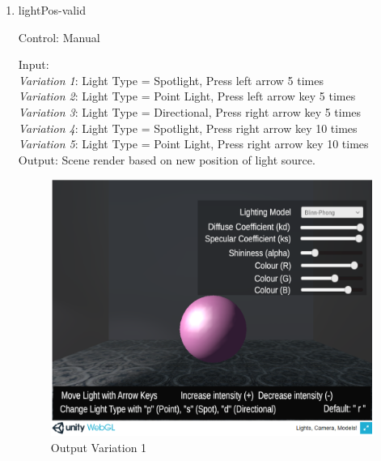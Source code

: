 \documentclass[12pt, titlepage]{article}
\begin{document}
\begin{enumerate}
	\item{lightPos-valid\\}
	
	Control: Manual
	
	Input: \\
	\textit{Variation 1}: Light Type = Spotlight, Press left arrow 5 times\\
	\textit{Variation 2}: Light Type = Point Light, Press left arrow key 5 
	times\\
	\textit{Variation 3}: Light Type = Directional, Press right arrow key 5 
	times\\
	\textit{Variation 4}: Light Type = Spotlight, Press right arrow key 10
	times\\
	\textit{Variation 5}: Light Type = Point Light, Press right arrow key 10
	times\\
	
	Output: Scene render based on new position of light source.
	
	\begin{figure}[h]
		\centering
		\includegraphics[scale=0.25]{./images/fromVnVPlan/sphere-lit-spotlight-moveValid}
		\caption{Output Variation 1}
		\label{fig:spotlight-move}
	\end{figure}	
	

\end{enumerate}
\end{document}
